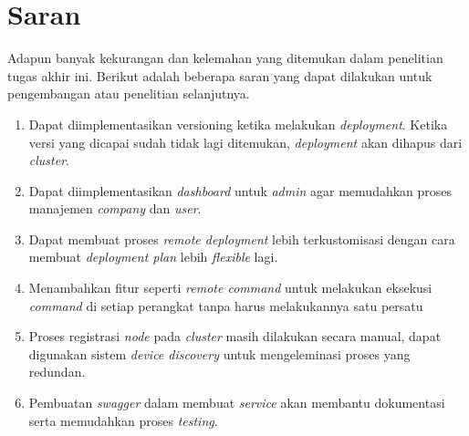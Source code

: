\section{Saran}
Adapun banyak kekurangan dan kelemahan yang ditemukan dalam penelitian tugas akhir ini. Berikut adalah beberapa saran yang dapat dilakukan untuk pengembangan atau penelitian selanjutnya.
\begin{enumerate}
  \item Dapat diimplementasikan versioning ketika melakukan \textit{deployment}. Ketika versi yang dicapai sudah tidak lagi ditemukan, \textit{deployment} akan dihapus dari \textit{cluster}.
  \item Dapat diimplementasikan	\textit{dashboard} untuk \textit{admin} agar memudahkan proses manajemen \textit{company} dan \textit{user}.
  \item Dapat membuat proses \textit{remote deployment} lebih terkustomisasi dengan cara membuat \textit{deployment plan} lebih \textit{flexible} lagi.
  \item Menambahkan fitur seperti \textit{remote command} untuk melakukan eksekusi \textit{command} di setiap perangkat tanpa harus melakukannya satu persatu
  \item Proses registrasi \textit{node} pada \textit{cluster} masih dilakukan secara manual, dapat digunakan sistem \textit{device discovery} untuk mengeleminasi proses yang redundan.
  \item Pembuatan \textit{swagger} dalam membuat \textit{service} akan membantu dokumentasi serta memudahkan proses \textit{testing}.
\end{enumerate}